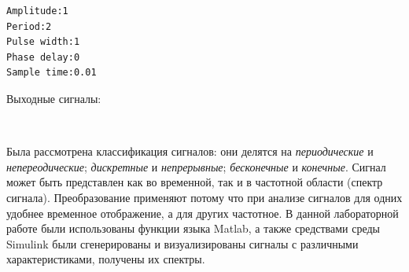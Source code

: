 \documentclass[a4paper,12pt]{article}
\begin{document}
\begin{enumerate}
{\begin{verbatim}
Amplitude:1
Period:2
Pulse width:1
Phase delay:0
Sample time:0.01
\end{verbatim}

Выходные сигналы:

\\}

{\bfseries{}}

Была рассмотрена классификация сигналов: они делятся на \textit{периодические} и \textit{непереодические}; \textit{дискретные} и \textit{непрерывные}; \textit{бесконечные} и \textit{конечные}. Сигнал может быть представлен как во временной, так и в частотной области (спектр сигнала). Преобразование применяют потому что при анализе сигналов для одних удобнее временное отображение, а для других частотное. В данной лабораторной работе были использованы функции языка Matlab, а также средствами среды Simulink были сгенерированы и визуализированы сигналы с различными характеристиками, получены их спектры.

\end{enumerate}
\end{document}
